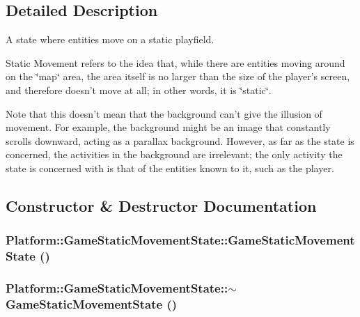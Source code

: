 \subsection{Detailed Description}
A state where entities move on a static playfield. 

Static Movement refers to the idea that, while there are entities moving around on the \char`\"{}map\char`\"{} area, the area itself is no larger than the size of the player's screen, and therefore doesn't move at all; in other words, it is \char`\"{}static\char`\"{}.

Note that this doesn't mean that the background can't give the illusion of movement. For example, the background might be an image that constantly scrolls downward, acting as a parallax background. However, as far as the state is concerned, the activities in the background are irrelevant; the only activity the state is concerned with is that of the entities known to it, such as the player. 

\subsection{Constructor \& Destructor Documentation}
\hypertarget{class_platform_1_1_game_static_movement_state_9f8e07bb645bb7d7137ca1cb432dd29b}{
\subsubsection[{GameStaticMovementState}]{\setlength{\rightskip}{0pt plus 5cm}Platform::GameStaticMovementState::GameStaticMovementState ()}}
\label{db/d55/class_platform_1_1_game_static_movement_state_9f8e07bb645bb7d7137ca1cb432dd29b}


\hypertarget{class_platform_1_1_game_static_movement_state_398bacded03a5bf659ae866c5cc61459}{
\subsubsection[{$\sim$GameStaticMovementState}]{\setlength{\rightskip}{0pt plus 5cm}Platform::GameStaticMovementState::$\sim$GameStaticMovementState ()}}
\label{db/d55/class_platform_1_1_game_static_movement_state_398bacded03a5bf659ae866c5cc61459}




